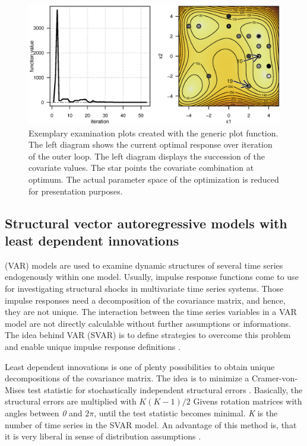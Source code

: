 \begin{figure}[htbp]
\centering
\includegraphics[width=1.025\textwidth]{Fig/fig2-ex2-plot.eps}
\caption{Exemplary examination plots created with the generic plot function. The left diagram shows the current optimal response over iteration of the outer loop. The left diagram displays the succession of the covariate values. The star points the covariate combination at optimum. The actual parameter space of the optimization is reduced for presentation purposes.}
\label{fig:fig2}
\end{figure}

\subsection{Structural vector autoregressive models with least dependent innovations}
 (VAR) models are used to examine dynamic structures of several time series endogenously within one model. Usually, impulse response functions come to use for investigating structural shocks in multivariate time series systems. Those impulse responses need a decomposition of the covariance matrix, and hence, they are not unique. The interaction between the time series variables in a VAR model are not directly calculable without further assumptions or informations. The idea behind  VAR (SVAR) is to define strategies to overcome this problem and enable unique impulse response definitions \citep{lutkepohl_2006}.

Least dependent innovations is one of plenty possibilities to obtain unique decompositions of the covariance matrix. The idea is to minimize a Cramer-von-Mises test statistic for stochastically independent structural errors \citep{genest_2007}. Basically, the structural errors are multiplied with $K(K-1)/2$ Givens rotation matrices with angles between \textit{0} and $2\pi$, until the test statistic becomes minimal. \textit{K} is the number of time series in the SVAR model. An advantage of this method is, that it is very liberal in sense of distribution assumptions \citep{herwartz_2014}.

